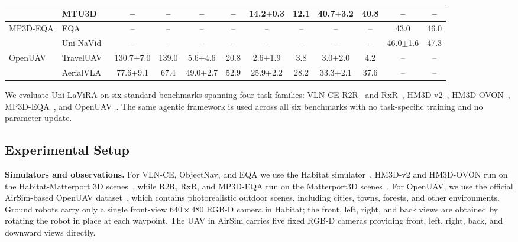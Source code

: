 \documentclass[conference]{IEEEtran}
\newcommand{\ourmethod}{Uni-LaViRA\xspace}
\begin{document}
\begin{table}[!t]
{\begin{tabular}{ll cc cc cc cc cc}
 & MTU3D~\cite{zhu2025mtu3d}                & -- & -- & -- & -- & 14.2$\pm$0.3 & 12.1 & 40.7$\pm$3.2 & 40.8 & -- & -- \\
\midrule
\multirow{2}{*}{MP3D-EQA}
 & EQA~\cite{das2018eqa}              & -- & -- & -- & -- & -- & -- & -- & -- & 43.0         & 46.0 \\
 & Uni-NaVid~\cite{zhang2024uninavid} & -- & -- & -- & -- & -- & -- & -- & -- & 46.0$\pm$1.6 & 47.3 \\
\midrule
\multirow{2}{*}{OpenUAV}
 & TravelUAV~\cite{wang2024openuav}   & 130.7$\pm$7.0 & 139.0 & 5.6$\pm$4.6  & 20.8 & 2.6$\pm$1.9  & 3.8  & 3.0$\pm$2.0  & 4.2  & -- & -- \\
 & AerialVLA~\cite{xu2026aerialvla}   & 77.6$\pm$9.1  & 67.4  & 49.0$\pm$2.7 & 52.9 & 25.9$\pm$2.2 & 28.2 & 33.3$\pm$2.1 & 37.6 & -- & -- \\
\bottomrule
\end{tabular}}
\end{table}

We evaluate \ourmethod on six standard benchmarks spanning four task families:
VLN-CE R2R~\cite{krantz2020beyond} and RxR~\cite{ku2020rxr},
HM3D-v2~\cite{ramakrishnan2021hm3d, yadav2023hm3dsem},
HM3D-OVON~\cite{yokoyama2024hm3dovon},
MP3D-EQA~\cite{das2018eqa,majumdar2024openeqa}, and
OpenUAV~\cite{wang2024openuav}. The same agentic framework is used across all
six benchmarks with no task-specific training and no parameter update.

\subsection{Experimental Setup}

\textbf{Simulators and observations.} For VLN-CE, ObjectNav, and EQA we use
the Habitat simulator~\cite{savva2019habitat}. HM3D-v2 and HM3D-OVON run on
the Habitat-Matterport 3D scenes~\cite{ramakrishnan2021hm3d,yadav2023hm3dsem},
while R2R, RxR, and MP3D-EQA run on the Matterport3D
scenes~\cite{chang2017matterport3d}. For OpenUAV, we use the official
AirSim-based OpenUAV dataset~\cite{wang2024openuav}, which contains
photorealistic outdoor scenes, including cities, towns, forests, and other
environments. Ground robots carry only a single front-view $640\times 480$
RGB-D camera in Habitat; the front, left, right, and back views are obtained
by rotating the robot in place at each waypoint.
The UAV in AirSim carries five fixed RGB-D cameras providing front, left,
right, back, and downward views directly.
\end{document}
